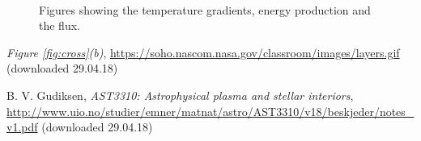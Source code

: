 \documentclass[a4paper,10pt]{article}
\begin{document}
\begin{figure}[H]
\centering
{}
\\
\caption{Figures showing the temperature gradients, energy production and the flux.}
\label{fig:nab_eps}
\end{figure}




\begin{thebibliography}{9}

  \textit{Figure \ref{fig:cross}(b)},
  \url{https://soho.nascom.nasa.gov/classroom/images/layers.gif} (downloaded 29.04.18)

  B. V. Gudiksen,
  \textit{AST3310: Astrophysical plasma and stellar interiors},
  \url{http://www.uio.no/studier/emner/matnat/astro/AST3310/v18/beskjeder/notes_v1.pdf} (downloaded 29.04.18)
\end{thebibliography}
\end{document}

